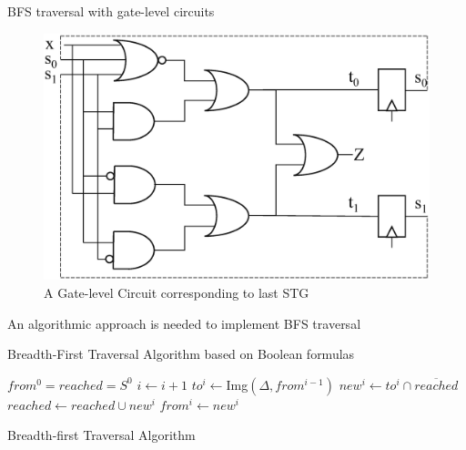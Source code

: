 \documentclass[xcolor=dvipsnames]{beamer}
\begin{document}

\begin{frame}{\large{BFS traversal with gate-level circuits}}
\begin{figure}[hbt]
\centerline{
\includegraphics[scale=0.35]{fsm_fig.eps}
}
\caption{A Gate-level Circuit corresponding to last STG}
\end{figure}
An algorithmic approach is needed to implement BFS traversal
\end{frame}


\begin{frame}{\large{Breadth-First Traversal Algorithm based on Boolean formulas}}
\begin{algorithm}[H]
\SetAlgoNoLine
  $from^0 = reached = S^0$\;
  {
  	$i \gets i + 1$\;
	$to^i \gets$Img$(\Delta, from^{i-1})$\;
	$new^i \gets to^i \cap \overline{reached}$\;
  	$reached \gets reached \cup new^i$\;
	$from^i \gets new^i$\;
  }
\caption {Breadth-first Traversal Algorithm}
\end{algorithm}
\end{frame}

\end{document}
